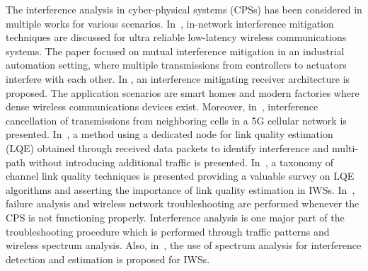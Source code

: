 The interference analysis in cyber-physical systems (CPSs) has been considered in multiple works for various scenarios. In~\cite{8639006}, in-network interference mitigation techniques are discussed for ultra reliable low-latency wireless communications systems. The paper focused on mutual interference mitigation in an industrial automation setting, where multiple transmissions from controllers to actuators interfere with each other. In \cite{Kumar2019}, an interference mitigating receiver architecture is proposed. The application scenarios are smart homes and modern factories where dense wireless communications devices exist. Moreover, in~\cite{Bhushan2014.NetworkDesensUsingIntfCancellation}, interference cancellation of transmissions from neighboring cells in a 5G cellular network is presented. In~\cite{Gomes2017.LQEinWSNs}, a method using a dedicated node for link quality estimation (LQE)  obtained through received data packets to identify interference and multi-path without introducing additional traffic is presented. In~\cite{Baccour2012.SurveyOnLinkEstimation}, a taxonomy of channel link quality techniques is presented providing a valuable survey on LQE algorithms and asserting the importance of link quality estimation in IWSs. In~\cite{Frounhoffer.Troubleshooting}, failure analysis and wireless network troubleshooting are performed whenever the CPS is not functioning properly. Interference analysis is one major part of the troubleshooting procedure which is performed through traffic patterns and wireless spectrum analysis. Also, in~\cite{NIST.InterfCoexCritical}, the use of spectrum analysis for interference detection and estimation is proposed for IWSs. 

